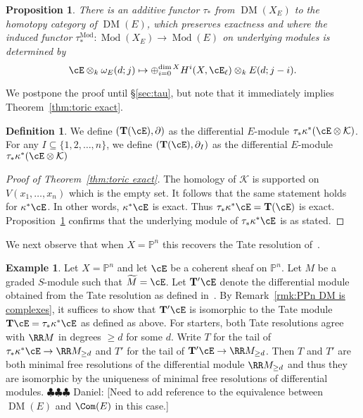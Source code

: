 \documentclass[12pt]{amsart}
\newtheorem{prop}[lemma]{Proposition}
\theoremstyle{definition}
\newtheorem{defn}[lemma]{Definition}
\newtheorem{example}[lemma]{Example}
\theoremstyle{remark}
\newcommand{\Kos}{\mathcal{K}}
\newcommand{\Tate}{{\mathbf{T}}}
\newcommand{\PP}{\mathbb P}
\newcommand{\Pic}{\operatorname{Pic}}
\newcommand{\daniel}[1]{{\color{blue} \sf $\clubsuit\clubsuit\clubsuit$ Daniel: [#1]}}
\def\DM{\operatorname{DM}}
\def\Mod{\operatorname{Mod}}
\begin{document}
\begin{prop}\label{prop:main tau}
There is an additive functor $\tau_*$ from $\DM(X_E)$ to the homotopy category of $\DM(E)$, which preserves exactness and where the induced functor $\tau^{\Mod}_*\colon \Mod(X_E)\to \Mod(E)$ on underlying modules is determined by
\[
\cE\otimes_k \omega_E(d;j) \mapsto \oplus_{i=0}^{\dim X}H^i(X,\cE_\ell) \otimes_k E(d; j-i). 
\]
%
\end{prop}
We postpone the proof until \S\ref{sec:tau}, but note that it immediately implies Theorem~\ref{thm:toric exact}.

\begin{defn}
We define $(\Tate(\cE),\partial)$ as the differential $E$-module $\tau_*\kappa^*(\cE\otimes \mathcal K)$.  For any $I\subseteq \{1,2,\dots,n\}$, we define $(\Tate(\cE),\partial_I)$ as the differential $E$-module $\tau_*\kappa^*(\cE\otimes \mathcal K)$
\end{defn}

\begin{proof}[Proof of Theorem~\ref{thm:toric exact}]
The homology of $\Kos$ is supported on $V(x_1,\dots,x_n)$ which is the empty set.  It follows that the same statement holds for $\kappa^*\cE$.  In other words, $\kappa^*\cE$ is exact.  Thus $\tau_*\kappa^*\cE=\Tate(\cE)$ is exact.  Proposition~\ref{prop:main tau} confirms that the underlying module of $\tau_*\kappa^*\cE$ is as stated.
\end{proof}

We next observe that when $X=\PP^n$ this recovers the Tate resolution of~\cite{EFS}.
\begin{example}\label{ex:compare with PPn}
Let $X=\PP^n$ and let $\cE$ be a coherent sheaf on $\PP^n$.  Let $M$ be a graded $S$-module such that $\widetilde{M}=\cE$. Let $\Tate' \cE$ denote the differential module obtained from the Tate resolution as defined in~\cite{EFS}.  By Remark~\ref{rmk:PPn DM is complexes}, it suffices to show that $\Tate'\cE$ is isomorphic to the Tate module $\Tate \cE=\tau_*\kappa^*\cE$ as defined as above. For starters, both Tate resolutions agree with $\RR M$ in degrees $\geq d$ for some $d$.  Write $T$ for the tail of $\tau_*\kappa^*\cE\to \RR M_{\geq d}$ and $T'$ for the tail of $\Tate'\cE\to \RR M_{\geq d}$.  Then $T$ and $T'$ are both minimal free resolutions of the differential module $\RR M_{\geq d}$ and thus they are isomorphic by the uniqueness of minimal free resolutions of differential modules.  
\daniel{Need to add reference to the equivalence between $\DM(E)$ and $\Com(E)$ in this case.}
\end{example}
\end{document}

